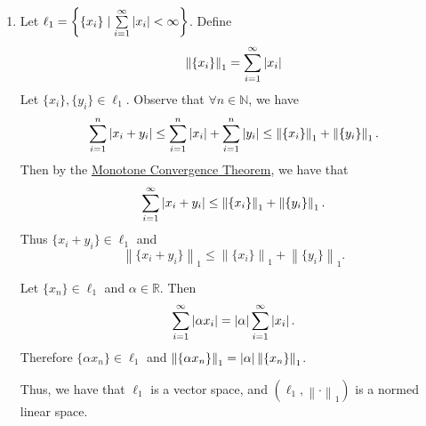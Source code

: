 \documentclass[notoc,notitlepage]{tufte-book}
\newcommand{\norm}[1]{\left\| #1 \right\|}
\begin{document}
\begin{eg}\label{eg:sequence_spaces}
  \begin{enumerate}
    \item Let $\ell_1 = \left\{ \{ x_i \} \mid \sum\limits_{i=1}^{\infty} \left|x_i\right| < \infty \right\}$. Define
      \begin{equation*}
        \norm{ \{ x_i \} }_1 = \sum_{i=1}^{\infty} \abs{x_i}
      \end{equation*}
      Let $\{ x_i \}, \{ y_i \} \in \ell_1$. Observe that $\forall n \in \mathbb{N}$, we have
      \begin{equation*}
        \sum_{i=1}^{n} \abs{x_i + y_i} \leq \sum_{i=1}^{n} \abs{x_i} + \sum_{i=1}^{n} \abs{y_i} \leq \norm{ \{ x_i \} }_1 + \norm{ \{ y_i \} }_1.
      \end{equation*}
      Then by the \hyperref[thm:monotone_convergence_theorem]{Monotone Convergence Theorem}, we have that
      \begin{equation*}
        \sum_{i=1}^{\infty} \abs{x_i + y_i} \leq \norm{ \{ x_i \} }_1 + \norm{ \{ y_i \} }_1.
      \end{equation*}
      Thus $\{ x_i + y_i \} \in \ell_1$ and
      \begin{equation*}
        \norm{ \{ x_i + y_i \} }_1 \leq \norm{ \{ x_i \} }_1 + \norm{ \{ y_i \} }_1.
      \end{equation*}

      Let $\{ x_n \} \in \ell_1$ and $\alpha \in \mathbb{R}$. Then
      \begin{equation*}
        \sum_{i=1}^{\infty} \left| \alpha x_i \right| = \left|\alpha\right| \sum_{i=1}^{\infty} \left|x_i\right|.
      \end{equation*}
      Therefore $\{ \alpha x_n \} \in \ell_1$ and $\norm{ \{ \alpha x_n \} }_1 = \abs{\alpha} \norm{ \{ x_n \} }_1$.

      Thus, we have that $\ell_1$ is a vector space, and $(\ell_1, \norm\cdot_1)$ is a normed linear space.


\end{enumerate}
\end{eg}
\end{document}
